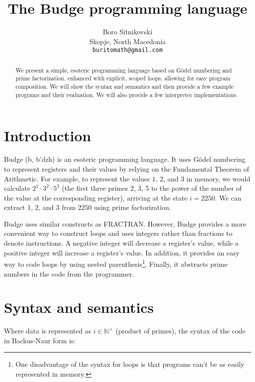 \documentclass{article}
\title{The Budge programming language}
\author{
  Boro Sitnikovski \\
  Skopje, North Macedonia \\
  \texttt{buritomath@gmail.com} \\
}
\begin{document}
\maketitle

\begin{abstract}
We present a simple, esoteric programming language based on Gödel numbering and prime factorization, enhanced with explicit, scoped loops, allowing for easy program composition. We will show the syntax and semantics and then provide a few example programs and their evaluation. We will also provide a few interpreter implementations.
\end{abstract}


\section{Introduction}

Budge (b\textturnv\textdyoghlig, b'dzh) is an esoteric programming language. It uses Gödel numbering\cite{b1} to represent registers and their values by relying on the Fundamental Theorem of Arithmetic\cite{b2}. For example, to represent the values $1$, $2$, and $3$ in memory, we would calculate $2^1 \cdot 3^2 \cdot 5^3$ (the first three primes 2, 3, 5 to the power of the number of the value at the corresponding register), arriving at the state $i = 2250$. We can extract $1$, $2$, and $3$ from $2250$ using prime factorization.

Budge uses similar constructs as FRACTRAN\cite{b3}. However, Budge provides a more convenient way to construct loops and uses integers rather than fractions to denote instructions. A negative integer will decrease a register's value, while a positive integer will increase a register's value. In addition, it provides an easy way to code loops by using nested parenthesis\footnote{One disadvantage of the syntax for loops is that programs can't be as easily represented in memory.}. Finally, it abstracts prime numbers in the code from the programmer.

\section{Syntax and semantics}

Where data is represented as $i \in \mathbb{N^+}$ (product of primes), the syntax of the code in Backus-Naur form\cite{b4} is:
\end{document}
